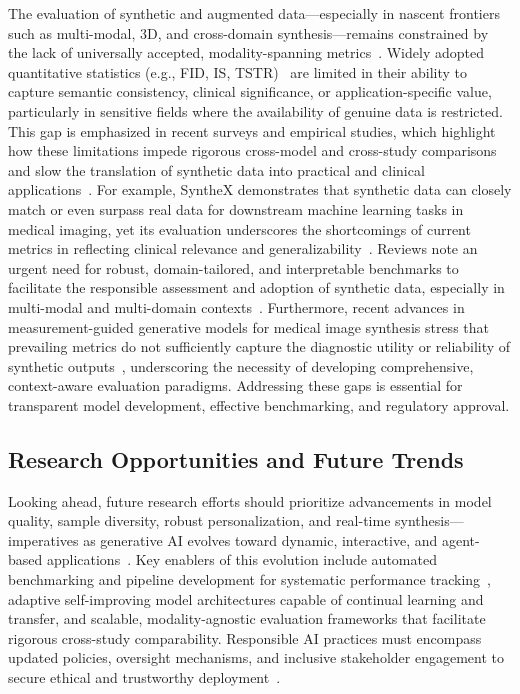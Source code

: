 \documentclass[sigconf]{acmart}
\begin{document}
The evaluation of synthetic and augmented data—especially in nascent frontiers such as multi-modal, 3D, and cross-domain synthesis—remains constrained by the lack of universally accepted, modality-spanning metrics~\cite{ref35,ref52,ref53,ref81,ref89,ref91}. Widely adopted quantitative statistics (e.g., FID, IS, TSTR)~\cite{ref35,ref52,ref53} are limited in their ability to capture semantic consistency, clinical significance, or application-specific value, particularly in sensitive fields where the availability of genuine data is restricted. This gap is emphasized in recent surveys and empirical studies, which highlight how these limitations impede rigorous cross-model and cross-study comparisons and slow the translation of synthetic data into practical and clinical applications~\cite{ref81,ref89,ref91}. For example, SyntheX demonstrates that synthetic data can closely match or even surpass real data for downstream machine learning tasks in medical imaging, yet its evaluation underscores the shortcomings of current metrics in reflecting clinical relevance and generalizability~\cite{ref81}. Reviews note an urgent need for robust, domain-tailored, and interpretable benchmarks to facilitate the responsible assessment and adoption of synthetic data, especially in multi-modal and multi-domain contexts~\cite{ref89}. Furthermore, recent advances in measurement-guided generative models for medical image synthesis stress that prevailing metrics do not sufficiently capture the diagnostic utility or reliability of synthetic outputs~\cite{ref91}, underscoring the necessity of developing comprehensive, context-aware evaluation paradigms. Addressing these gaps is essential for transparent model development, effective benchmarking, and regulatory approval.

\subsection{Research Opportunities and Future Trends}

Looking ahead, future research efforts should prioritize advancements in model quality, sample diversity, robust personalization, and real-time synthesis—imperatives as generative AI evolves toward dynamic, interactive, and agent-based applications~\cite{ref88,ref89,ref90,ref101,ref102}. Key enablers of this evolution include automated benchmarking and pipeline development for systematic performance tracking~\cite{ref88,ref89}, adaptive self-improving model architectures capable of continual learning and transfer, and scalable, modality-agnostic evaluation frameworks that facilitate rigorous cross-study comparability. Responsible AI practices must encompass updated policies, oversight mechanisms, and inclusive stakeholder engagement to secure ethical and trustworthy deployment~\cite{ref1,ref8,ref11,ref15,ref16,ref24,ref32,ref54,ref58,ref60,ref63,ref67,ref68,ref69,ref70,ref76,ref77,ref78,ref81,ref82,ref88,ref89}.
\end{document}
